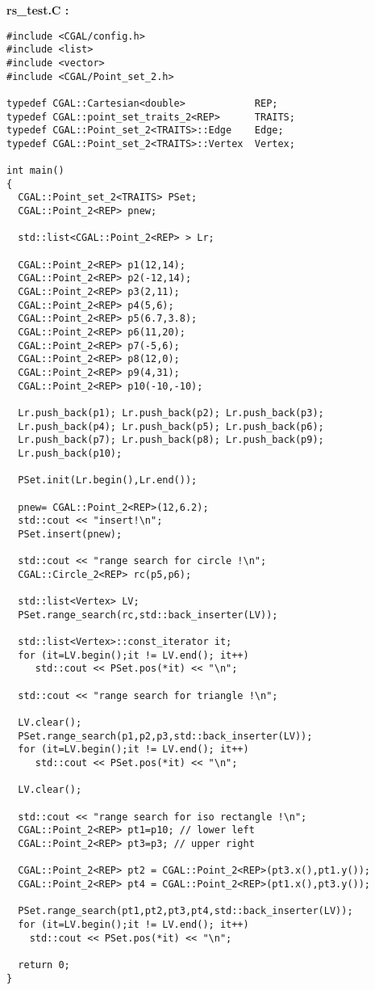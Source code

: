 {\bf rs\_test.C :}
\begin{verbatim}
#include <CGAL/config.h>
#include <list>
#include <vector>
#include <CGAL/Point_set_2.h>

typedef CGAL::Cartesian<double>            REP;
typedef CGAL::point_set_traits_2<REP>      TRAITS;
typedef CGAL::Point_set_2<TRAITS>::Edge    Edge;
typedef CGAL::Point_set_2<TRAITS>::Vertex  Vertex;

int main()
{
  CGAL::Point_set_2<TRAITS> PSet;
  CGAL::Point_2<REP> pnew;

  std::list<CGAL::Point_2<REP> > Lr;
  
  CGAL::Point_2<REP> p1(12,14);
  CGAL::Point_2<REP> p2(-12,14);  
  CGAL::Point_2<REP> p3(2,11);
  CGAL::Point_2<REP> p4(5,6);
  CGAL::Point_2<REP> p5(6.7,3.8);
  CGAL::Point_2<REP> p6(11,20);
  CGAL::Point_2<REP> p7(-5,6);  
  CGAL::Point_2<REP> p8(12,0);
  CGAL::Point_2<REP> p9(4,31);
  CGAL::Point_2<REP> p10(-10,-10); 
  
  Lr.push_back(p1); Lr.push_back(p2); Lr.push_back(p3);
  Lr.push_back(p4); Lr.push_back(p5); Lr.push_back(p6);
  Lr.push_back(p7); Lr.push_back(p8); Lr.push_back(p9);
  Lr.push_back(p10); 

  PSet.init(Lr.begin(),Lr.end()); 

  pnew= CGAL::Point_2<REP>(12,6.2);
  std::cout << "insert!\n"; 
  PSet.insert(pnew);

  std::cout << "range search for circle !\n";  
  CGAL::Circle_2<REP> rc(p5,p6);

  std::list<Vertex> LV;
  PSet.range_search(rc,std::back_inserter(LV));

  std::list<Vertex>::const_iterator it;
  for (it=LV.begin();it != LV.end(); it++)
     std::cout << PSet.pos(*it) << "\n";      
 
  std::cout << "range search for triangle !\n";    
  
  LV.clear();
  PSet.range_search(p1,p2,p3,std::back_inserter(LV));
  for (it=LV.begin();it != LV.end(); it++)
     std::cout << PSet.pos(*it) << "\n";
        
  LV.clear();
 
  std::cout << "range search for iso rectangle !\n";
  CGAL::Point_2<REP> pt1=p10; // lower left
  CGAL::Point_2<REP> pt3=p3; // upper right 
  
  CGAL::Point_2<REP> pt2 = CGAL::Point_2<REP>(pt3.x(),pt1.y());
  CGAL::Point_2<REP> pt4 = CGAL::Point_2<REP>(pt1.x(),pt3.y());
  
  PSet.range_search(pt1,pt2,pt3,pt4,std::back_inserter(LV));
  for (it=LV.begin();it != LV.end(); it++)
    std::cout << PSet.pos(*it) << "\n"; 

  return 0;
}
\end{verbatim}

